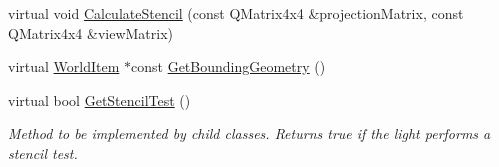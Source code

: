 \begin{DoxyCompactItemize}
\item 
virtual void \mbox{\hyperlink{class_geometry_engine_1_1_geometry_world_item_1_1_geometry_light_1_1_light_ae50fab4782158671041ac986dfead7fc}{Calculate\+Stencil}} (const Q\+Matrix4x4 \&projection\+Matrix, const Q\+Matrix4x4 \&view\+Matrix)
\item 
virtual \mbox{\hyperlink{class_geometry_engine_1_1_geometry_world_item_1_1_world_item}{World\+Item}} $\ast$const \mbox{\hyperlink{class_geometry_engine_1_1_geometry_world_item_1_1_geometry_light_1_1_light_a53cc9a8e7ab6eab9d34f1655ef33eaef}{Get\+Bounding\+Geometry}} ()
\item 
\mbox{\label{class_geometry_engine_1_1_geometry_world_item_1_1_geometry_light_1_1_light_ac057b7a5229d61154d8a79f4467eb042}} 
virtual bool \mbox{\hyperlink{class_geometry_engine_1_1_geometry_world_item_1_1_geometry_light_1_1_light_ac057b7a5229d61154d8a79f4467eb042}{Get\+Stencil\+Test}} ()
\begin{DoxyCompactList}\small\item\em Method to be implemented by child classes. Returns true if the light performs a stencil test. \end{DoxyCompactList}\end{DoxyCompactItemize}
